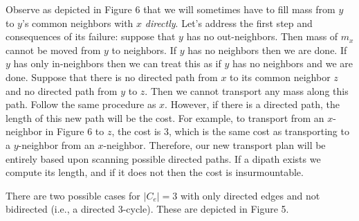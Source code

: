 \documentclass{Dissertate}
\theoremstyle{definition}
\theoremstyle{definition} %
\theoremstyle{definition}
\begin{document}
Observe as depicted in Figure 6 that we will sometimes have to fill mass from $y$ to $y$'s common neighbors with $x$ \textit{directly}. Let's address the first step and consequences of its failure: suppose that $y$ has no out-neighbors. Then mass of $m_x$ cannot be moved from $y$ to neighbors. If $y$ has no neighbors then we are done. If $y$ has only in-neighbors then we can treat this as if $y$ has no neighbors and we are done. Suppose that there is no directed path from $x$ to its common neighbor $z$ and no directed path from $y$ to $z$. Then we cannot transport any mass along this path. Follow the same procedure as $x$. However, if there is a directed path, the length of this new path will be the cost. For example, to transport from an $x$-neighbor in Figure 6 to $z$, the cost is 3, which is the same cost as transporting to a $y$-neighbor from an $x$-neighbor. Therefore, our new transport plan will be entirely based upon scanning possible directed paths. If a dipath exists we compute its length, and if it does not then the cost is insurmountable.

\vspace{0.5cm}

There are two possible cases for $|C_e| = 3$ with only directed edges and not bidirected (i.e., a directed 3-cycle). These are depicted in Figure 5.
\end{document}
